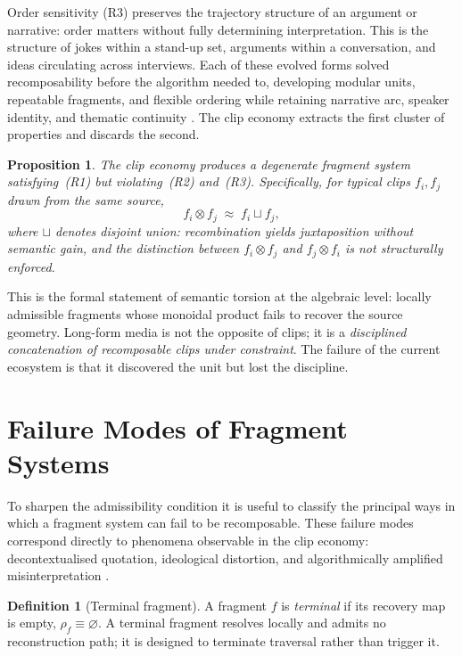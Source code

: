 \documentclass{amsart}
\theoremstyle{plain}
\newtheorem{proposition}[theorem]{Proposition}
\theoremstyle{definition}
\newtheorem{definition}[theorem]{Definition}
\theoremstyle{remark}
\newcommand{\tensor}{\otimes}
\begin{document}
Order sensitivity (R3) preserves the trajectory structure of an argument or
narrative: order matters without fully determining interpretation.  This is the
structure of jokes within a stand-up set, arguments within a conversation, and
ideas circulating across interviews.  Each of these evolved forms solved
recomposability before the algorithm needed to, developing modular units, repeatable
fragments, and flexible ordering while retaining narrative arc, speaker identity,
and thematic continuity \cite{boyd2010}.  The clip economy extracts the first
cluster of properties and discards the second.

\begin{proposition}
  \label{prop:nonrecomposable}
  The clip economy produces a degenerate fragment system satisfying~(R1) but
  violating~(R2) and~(R3).  Specifically, for typical clips $f_i, f_j$ drawn from
  the same source,
  \[
    f_i \tensor f_j \;\approx\; f_i \sqcup f_j,
  \]
  where $\sqcup$ denotes disjoint union: recombination yields juxtaposition
  without semantic gain, and the distinction between $f_i \tensor f_j$ and
  $f_j \tensor f_i$ is not structurally enforced.
\end{proposition}

This is the formal statement of semantic torsion at the algebraic level: locally
admissible fragments whose monoidal product fails to recover the source geometry.
Long-form media is not the opposite of clips; it is a \emph{disciplined
concatenation of recomposable clips under constraint}.  The failure of the current
ecosystem is that it discovered the unit but lost the discipline.

\section{Failure Modes of Fragment Systems}
\label{sec:failure}

To sharpen the admissibility condition it is useful to classify the principal ways
in which a fragment system can fail to be recomposable.  These failure modes
correspond directly to phenomena observable in the clip economy: decontextualised
quotation, ideological distortion, and algorithmically amplified misinterpretation
\cite{zeynep2015,doctorow2023}.

\begin{definition}[Terminal fragment]
  \label{def:terminal}
  A fragment $f$ is \emph{terminal} if its recovery map is empty,
  $\rho_f \equiv \varnothing$.  A terminal fragment resolves locally and admits no
  reconstruction path; it is designed to terminate traversal rather than trigger
  it.
\end{definition}
\end{document}
